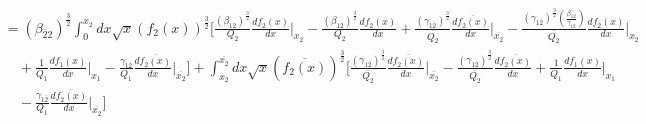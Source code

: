 \documentclass[fleqn, 10pt]{article}
\begin{document}
                \begin{equation*}
                \begin{split}
                    &= (\beta_{\overline{2}2})^\frac{3}{2} \int^{x_2}_0 dx \sqrt{x} (f_2(x))^\frac{3}{2} \Biggl[   \frac{(\beta_{12})^\frac{3}{2}}{Q_2} \frac{df_2(x)}{dx} \Bigg|_{x_2} - \frac{(\beta_{12})^\frac{3}{2}}{Q_2}\frac{df_2(x)}{dx} +   \frac{(\gamma_{1\overline{2}})^\frac{3}{2}}{\overline{Q_{2}}} \frac{d\overline{f_{2}(x)}}{dx} \Bigg|_{\overline{x_{2}}} -   \frac{(\gamma_{1\overline{2}})^\frac{3}{2}\left( \frac{\beta_{12}}{\gamma_{1\overline{2}}}\right)}{\overline{Q_{2}}} \frac{df_2(x)}{dx} \Bigg|_{x_2}  \\ & \quad +   \frac{1}{Q_1} \frac{df_1(x)}{dx} \Bigg|_{x_1} -   \frac{\gamma_{1\overline{2}}}{Q_1} \frac{d\overline{f_{2}(x)}}{dx} \Bigg|_{\overline{x_{2}}} \Biggr] + \int^{\overline{x_{2}}}_{x_2} dx \sqrt{x} (\overline{f_{2}(x)})^\frac{3}{2} \Biggl[   \frac{(\gamma_{1\overline{2}})^\frac{3}{2}}{\overline{Q_{2}}} \frac{d\overline{f_{2}(x)}}{dx} \Bigg|_{\overline{x_{2}}} - \frac{(\gamma_{1\overline{2}})^\frac{3}{2}}{\overline{Q_{2}}} \frac{d\overline{f_{2}(x)}}{dx} +   \frac{1}{Q_1} \frac{df_1(x)}{dx} \Bigg|_{x_1}  \\ & \quad -   \frac{\gamma_{1\overline{2}}}{Q_1} \frac{d\overline{f_{2}(x)}}{dx} \Bigg|_{\overline{x_{2}}} \Biggr]
                    \end{split}
                \end{equation*}
\end{document}
